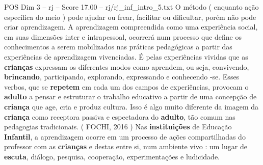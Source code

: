 \begin{textsample}{POS Dim 3 – rj – Score 17.00 – rj/rj\_inf\_intro\_5.txt}
O método ( enquanto ação específica do meio ) pode ajudar ou frear, facilitar ou dificultar, porém não pode criar aprendizagem.
A aprendizagem compreendida como uma experiência social, em suas dimensões inter e intrapessoal, ocorrerá num processo que define os conhecimentos a serem mobilizados nas práticas pedagógicas a partir das experiências de aprendizagem vivenciadas.
É pelas experiências vividas que as \textbf{crianças} expressam os diferentes modos como aprendem, ou seja, convivendo, \textbf{brincando}, participando, explorando, expressando e conhecendo -se.
Esses verbos, que se \textbf{repetem} em cada um dos campos de experiências, provocam o \textbf{adulto} a pensar e estruturar o trabalho educativo a partir de uma concepção de \textbf{criança} que age, cria e produz cultura.
Isso é algo muito diferente da imagem da \textbf{criança} como receptora passiva e espectadora do \textbf{adulto}, tão comum nas pedagogias tradicionais. ( FOCHI, 2016 ) Nas \textbf{instituições} de Educação \textbf{Infantil}, a aprendizagem ocorre em um processo de ações compartilhadas do professor com as \textbf{crianças} e destas entre si, num ambiente vivo : um lugar de \textbf{escuta}, diálogo, pesquisa, cooperação, experimentações e ludicidade.

\end{textsample}
